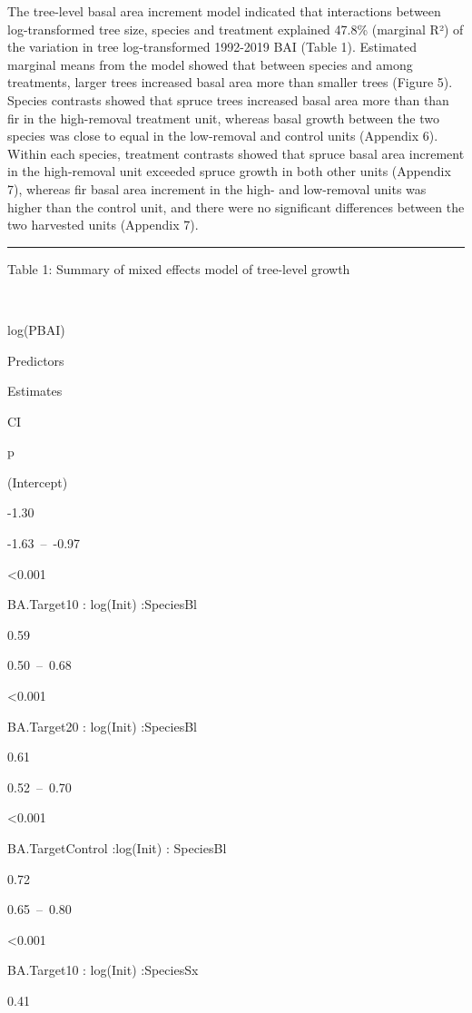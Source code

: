 \documentclass[
]{article}
\begin{document}
The tree-level basal area increment model indicated that interactions between log-transformed tree size, species and treatment explained 47.8\% (marginal R²) of the variation in tree log-transformed 1992-2019 BAI (Table 1). Estimated marginal means from the model showed that between species and among treatments, larger trees increased basal area more than smaller trees (Figure 5). Species contrasts showed that spruce trees increased basal area more than than fir in the high-removal treatment unit, whereas basal growth between the two species was close to equal in the low-removal and control units (Appendix 6). Within each species, treatment contrasts showed that spruce basal area increment in the high-removal unit exceeded spruce growth in both other units (Appendix 7), whereas fir basal area increment in the high- and low-removal units was higher than the control unit, and there were no significant differences between the two harvested units (Appendix 7).

\begin{center}\rule{0.5\linewidth}{0.5pt}\end{center}

Table 1: Summary of mixed effects model of tree-level growth

~

log(PBAI)

Predictors

Estimates

CI

p

(Intercept)

-1.30

-1.63~--~-0.97

\textless{}0.001

BA.Target10 : log(Init) :SpeciesBl

0.59

0.50~--~0.68

\textless{}0.001

BA.Target20 : log(Init) :SpeciesBl

0.61

0.52~--~0.70

\textless{}0.001

BA.TargetControl :log(Init) : SpeciesBl

0.72

0.65~--~0.80

\textless{}0.001

BA.Target10 : log(Init) :SpeciesSx

0.41
\end{document}
